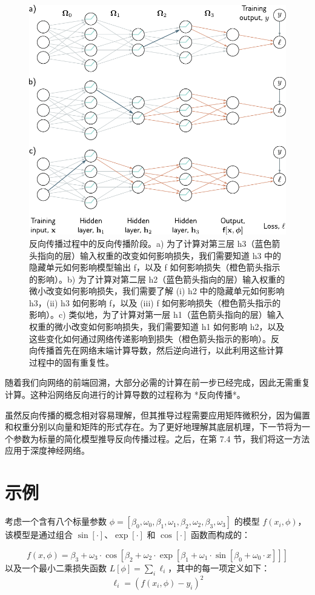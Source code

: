 \documentclass[lang=cn,newtx,10pt,scheme=chinese]{elegantbook}
\begin{document}
\begin{figure}[ht!]
\centering
\includegraphics[width=0.7\linewidth]{PDFFigures/UDLChap7PDF/Train2BPIntuitions2.pdf}
\caption{反向传播过程中的反向传播阶段。a) 为了计算对第三层 h3（蓝色箭头指向的层）输入权重的改变如何影响损失，我们需要知道 h3 中的隐藏单元如何影响模型输出 f，以及 f 如何影响损失（橙色箭头指示的影响）。b) 为了计算对第二层 h2（蓝色箭头指向的层）输入权重的微小改变如何影响损失，我们需要了解 (i) h2 中的隐藏单元如何影响 h3，(ii) h3 如何影响 f，以及 (iii) f 如何影响损失（橙色箭头指示的影响）。c) 类似地，为了计算对第一层 h1（蓝色箭头指向的层）输入权重的微小改变如何影响损失，我们需要知道 h1 如何影响 h2，以及这些变化如何通过网络传递影响到损失（橙色箭头指示的影响）。反向传播首先在网络末端计算导数，然后逆向进行，以此利用这些计算过程中的固有重复性。}
\end{figure}

随着我们向网络的前端回溯，大部分必需的计算在前一步已经完成，因此无需重复计算。这种沿网络反向进行的计算导数的过程称为 *反向传播*。

虽然反向传播的概念相对容易理解，但其推导过程需要应用矩阵微积分，因为偏置和权重分别以向量和矩阵的形式存在。为了更好地理解其底层机理，下一节将为一个参数为标量的简化模型推导反向传播过程。之后，在第 7.4 节，我们将这一方法应用于深度神经网络。
\section{示例}
考虑一个含有八个标量参数 \(\phi = [\beta_0, \omega_0, \beta_1, \omega_1, \beta_2, \omega_2, \beta_3, \omega_3]\) 的模型 \(f(x_i, \phi)\)，该模型是通过组合 \(\sin[\cdot]\)、\(\exp[\cdot]\) 和 \(\cos[\cdot]\) 函数而构成的：

\begin{equation}
f(x, \phi) = \beta_3 + \omega_3 \cdot \cos[\beta_2 + \omega_2 \cdot \exp[\beta_1 + \omega_1 \cdot \sin[\beta_0 + \omega_0 \cdot x]]] 
\end{equation}
以及一个最小二乘损失函数 \(L[\phi] = \sum_i \ell_i\)，其中的每一项定义如下：
\begin{equation}
\ell_i = (f(x_i, \phi) - y_i)^2 
\end{equation}
\end{document}
